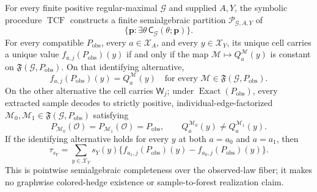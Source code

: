 For every finite positive regular-maximal \(\mathcal G\) and supplied \(A,Y\), the symbolic procedure \(\operatorname{TCF}\) constructs a finite semialgebraic partition \(\mathscr P_{\mathcal G,A,Y}\) of
\[
\{\mathbf p:\exists\theta\,\mathsf C_{\mathcal G}(\theta;\mathbf p)\}.
\]
For every compatible \(P_{\mathrm{obs}}\), every \(a\in\mathcal X_A\), and every \(y\in\mathcal X_Y\), its unique cell carries a unique value \(f_{a,j}(P_{\mathrm{obs}})(y)\) if and only if the map \(\mathcal M\mapsto Q_a^{\mathcal M}(y)\) is constant on \(\mathfrak F(\mathcal G,P_{\mathrm{obs}})\). On that identifying alternative,
\[
f_{a,j}(P_{\mathrm{obs}})(y)=Q_a^{\mathcal M}(y)
\quad\text{for every }\mathcal M\in\mathfrak F(\mathcal G,P_{\mathrm{obs}}).
\]
On the other alternative the cell carries \(\mathsf W_j\); under \(\operatorname{Exact}(P_{\mathrm{obs}})\), every extracted sample decodes to strictly positive, individual-edge-factorized \(\mathcal M_0,\mathcal M_1\in\mathfrak F(\mathcal G,P_{\mathrm{obs}})\) satisfying
\[
P_{\mathcal M_0}(\mathcal O)=P_{\mathcal M_1}(\mathcal O)=P_{\mathrm{obs}},
\qquad
Q_a^{\mathcal M_0}(y)\neq Q_a^{\mathcal M_1}(y).
\]
If the identifying alternative holds for every \(y\) at both \(a=a_0\) and \(a=a_1\), then
\[
\tau_{s_Y}=\sum_{y\in\mathcal X_Y}s_Y(y)
\{f_{a_1,j}(P_{\mathrm{obs}})(y)-f_{a_0,j}(P_{\mathrm{obs}})(y)\}.
\]
This is pointwise semialgebraic completeness over the observed-law fiber; it makes no graphwise colored-hedge existence or sample-to-forest realization claim.